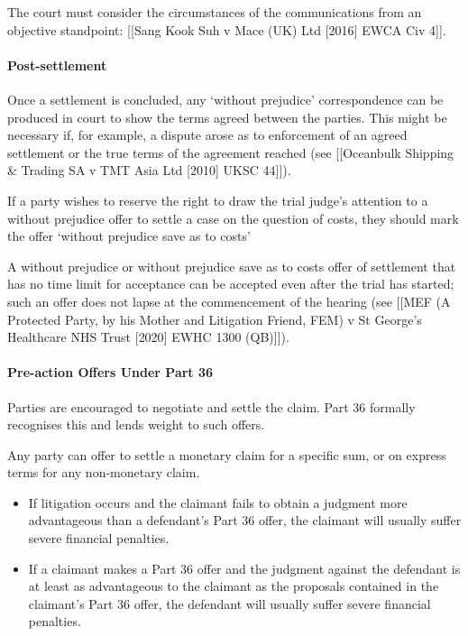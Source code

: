 \documentclass[
]{article}
\newenvironment{Shaded}{}{}
\newcommand{\NormalTok}[1]{#1}
\providecommand{\tightlist}{%
  \setlength{\itemsep}{0pt}\setlength{\parskip}{0pt}}
\begin{document}
The court must consider the circumstances of the communications from an
objective standpoint: {[}{[}Sang Kook Suh v Mace (UK) Ltd {[}2016{]}
EWCA Civ 4{]}{]}.

\hypertarget{post-settlement}{%
\paragraph{Post-settlement}\label{post-settlement}}

Once a settlement is concluded, any `without prejudice' correspondence
can be produced in court to show the terms agreed between the parties.
This might be necessary if, for example, a dispute arose as to
enforcement of an agreed settlement or the true terms of the agreement
reached (see {[}{[}Oceanbulk Shipping \& Trading SA v TMT Asia Ltd
{[}2010{]} UKSC 44{]}{]}).

\begin{Shaded}
\begin{Highlighting}[]
\NormalTok{If a party wishes to reserve the right to draw the trial judge’s attention to a without prejudice offer to settle a case on the question of costs, they should mark the offer ‘without prejudice save as to costs’}
\end{Highlighting}
\end{Shaded}

A without prejudice or without prejudice save as to costs offer of
settlement that has no time limit for acceptance can be accepted even
after the trial has started; such an offer does not lapse at the
commencement of the hearing (see {[}{[}MEF (A Protected Party, by his
Mother and Litigation Friend, FEM) v St George's Healthcare NHS Trust
{[}2020{]} EWHC 1300 (QB){]}{]}).

\hypertarget{pre-action-offers-under-part-36}{%
\paragraph{Pre-action Offers Under Part
36}\label{pre-action-offers-under-part-36}}

Parties are encouraged to negotiate and settle the claim. Part 36
formally recognises this and lends weight to such offers.

Any party can offer to settle a monetary claim for a specific sum, or on
express terms for any non-monetary claim.

\begin{itemize}
\tightlist
\item
  If litigation occurs and the claimant fails to obtain a judgment more
  advantageous than a defendant's Part 36 offer, the claimant will
  usually suffer severe financial penalties.
\item
  If a claimant makes a Part 36 offer and the judgment against the
  defendant is at least as advantageous to the claimant as the proposals
  contained in the claimant's Part 36 offer, the defendant will usually
  suffer severe financial penalties.
\end{itemize}
\end{document}
